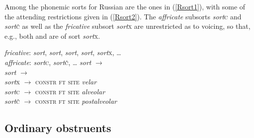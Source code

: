 \documentclass[output=paper]{langsci/langscibook}
\begin{document}
Among the phonemic sorts %
for Russian are the ones in (\ref{Rsort1}), with some of the attending
restrictions given in (\ref{Rsort2}). The \textit{affricate} subsorts \textit{sort}{\textunderscore}\textsc{c} and \textit{sort}{\textunderscore}\textsc{\v{c}} as well as the \textit{fricative}
subsort \textit{sort}{\textunderscore}\textsc{x} are un\-restricted as to voicing, so that,
e.g., both \textipa{[x]} and \textipa{[G]} are of sort \textit{sort}{\textunderscore}\textsc{x}.
\begin{exe}
\ex
\label{Rsort1} \textit{fricative}\/: \textit{sort}{\textunderscore}, \textit{sort}{\textunderscore},
  \textit{sort}{\textunderscore}, \textit{sort}{\textunderscore},  \textit{sort}{\textunderscore}\textsc{x}, \ldots\\
  \textit{affricate}\/: \textit{sort}{\textunderscore}\textsc{c}, \textit{sort}{\textunderscore}\textsc{\v{c}}, \ldots
%
\ex
\label{Rsort2}
  \textit{sort}{\textunderscore} $\rightarrow $ {\small
    } \\
  \textit{sort}{\textunderscore} $\rightarrow $ {\small
    }\\
  \textit{sort}{\textunderscore}\textsc{x} $\rightarrow $ 
  \textsc{constr ft site} \textit{velar} \\
  \textit{sort}{\textunderscore}\textsc{c} $\rightarrow $ 
  \textsc{constr ft site} \textit{alveolar} \\
  \textit{sort}{\textunderscore}\textsc{\v{c}} $\rightarrow $ 
  \textsc{constr ft site} \textit{postalveolar}
  
\end{exe}



\subsection{Ordinary obstruents}
\label{sec:1.7.2}
\end{document}
